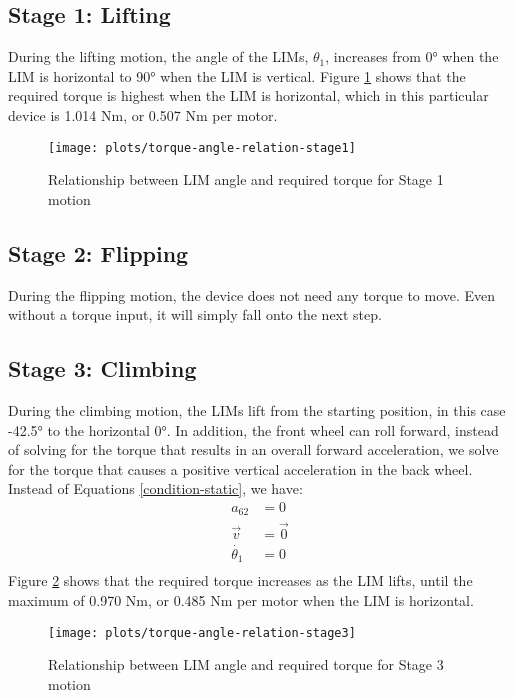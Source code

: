 \subsection*{Stage 1: Lifting}
During the lifting motion, the angle of the LIMs, $\theta_1$, increases from 0° when the LIM is horizontal to 90° when the LIM is vertical. Figure \ref{torque-angle-relation-stage1} shows that the required torque is highest when the LIM is horizontal, which in this particular device is 1.014 Nm, or 0.507 Nm per motor.
\begin{figure}[h]
	\centering
	\texttt{[image: plots/torque-angle-relation-stage1]}
	\caption{Relationship between LIM angle and required torque for Stage 1 motion}
	\label{torque-angle-relation-stage1}
\end{figure}
\subsection*{Stage 2: Flipping}
During the flipping motion, the device does not need any torque to move. Even without a torque input, it will simply fall onto the next step.

\subsection*{Stage 3: Climbing}
During the climbing motion, the LIMs lift from the starting position, in this case -42.5° to the horizontal 0°. In addition, the front wheel can roll forward, instead of solving for the torque that results in an overall forward acceleration, we solve for the torque that causes a positive vertical acceleration in the back wheel. Instead of Equations \ref{condition-static}, we have:
\begin{subequations}
	\label{condition-climbing}
	\begin{align}
		a_{62} &= 0\\
		\vec{v} &= \vec{0}\\
		\dot{\theta_1} &= 0\\
	\end{align}
\end{subequations}
Figure \ref{torque-angle-relation-stage3} shows that the required torque increases as the LIM lifts, until the maximum of 0.970 Nm, or 0.485 Nm per motor when the LIM is horizontal.
\begin{figure}[h]
	\centering
	\texttt{[image: plots/torque-angle-relation-stage3]}
	\caption{Relationship between LIM angle and required torque for Stage 3 motion}
	\label{torque-angle-relation-stage3}
\end{figure}

